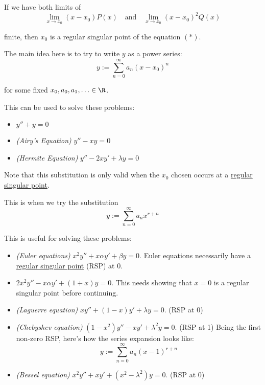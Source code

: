 If we have both limits of
\begin{equation*}
  \lim_{x\to x_0}(x-x_0)P(x)\quad\text{and}\quad\lim_{x\to x_0}(x-x_0)^2Q(x)
\end{equation*}

finite, then $x_0$ is a regular singular point of the equation $(*)$.

\label{fdab69a}

The main idea here is to try to write $y$ as a power series:
$$
  y:=\sum_{n=0}^\infty a_n(x-x_0)^n
$$

for some fixed $x_0,a_0,a_1,\ldots\in\R$.

This can be used to solve these problems:
\begin{itemize}
  \item $y''+y=0$
  \item \textit{(Airy's Equation)} $y''-xy=0$
  \item \textit{(Hermite Equation)} $y''-2xy'+\lambda y=0$
\end{itemize}

Note that this substitution is only valid when the $x_0$ chosen occurs at a
\href{f490530}{regular singular point}.

\label{b1a3270}

This is when we try the substitution
$$
  y:=\sum_{n=0}^\infty a_nx^{r+n}
$$

This is useful for solving these problems:
\begin{itemize}
  \item \textit{(Euler equations)} $x^2y''+x\alpha y'+\beta y=0$. Euler
        equations necessarily have a \href{f490530}{regular singular point}
        (RSP) at $0$.
  \item $2x^2y''-x\alpha y'+(1+x)y=0$. This needs showing that $x=0$ is a
        regular singular point before continuing.
  \item \textit{(Laguerre equation)} $xy''+(1-x)y'+\lambda y=0$. (RSP at 0)
  \item \textit{(Chebyshev equation)} $(1-x^2)y''-xy'+\lambda^2y=0$. (RSP at 1)
        Being the first non-zero RSP, here's how the series expansion looks
        like:
        $$
          y:=\sum_{n=0}^\infty a_n(x-1)^{r+n}
        $$
  \item \textit{(Bessel equation)} $x^2y''+xy'+(x^2-\lambda^2)y=0$. (RSP at 0)
\end{itemize}

